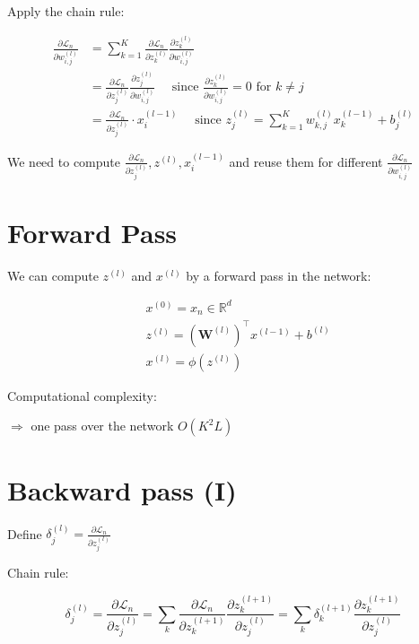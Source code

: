 Apply the chain rule:

$$
\begin{aligned}
\frac{\partial \mathscr{L}_{n}}{\partial w_{i, j}^{(l)}} & =\sum_{k=1}^{K} \frac{\partial \mathscr{L}_{n}}{\partial z_{k}^{(l)}} \frac{\partial z_{k}^{(l)}}{\partial w_{i, j}^{(l)}} \\
& =\frac{\partial \mathscr{L}_{n}}{\partial z_{j}^{(l)}} \frac{\partial z_{j}^{(l)}}{\partial w_{i, j}^{(l)}} \quad \text { since } \frac{\partial z_{k}^{(l)}}{\partial w_{i, j}^{(l)}}=0 \text { for } k \neq j \\
& =\frac{\partial \mathscr{L}_{n}}{\partial z_{j}^{(l)}} \cdot x_{i}^{(l-1)} \quad \text { since } z_{j}^{(l)}=\sum_{k=1}^{K} w_{k, j}^{(l)} x_{k}^{(l-1)}+b_{j}^{(l)}
\end{aligned}
$$

We need to compute $\frac{\partial \mathscr{L}_{n}}{\partial z_{j}^{(l)}}, z^{(l)}, x_{i}^{(l-1)}$ and reuse them for different $\frac{\partial \mathscr{L}_{n}}{\partial w_{i, j}^{(l)}}$

\section*{Forward Pass}
We can compute $z^{(l)}$ and $x^{(l)}$ by a forward pass in the network:

$$
\begin{aligned}
& x^{(0)}=x_{n} \in \mathbb{R}^{d} \\
& z^{(l)}=\left(\mathbf{W}^{(l)}\right)^{\top} x^{(l-1)}+b^{(l)} \\
& x^{(l)}=\phi\left(z^{(l)}\right)
\end{aligned}
$$

Computational complexity:



$\Rightarrow$ one pass over the network $O\left(K^{2} L\right)$

\section*{Backward pass (I)}
Define $\delta_{j}^{(l)}=\frac{\partial \mathscr{L}_{n}}{\partial z_{j}^{(l)}}$

Chain rule:

$$
\delta_{j}^{(l)}=\frac{\partial \mathscr{L}_{n}}{\partial z_{j}^{(l)}}=\sum_{k} \frac{\partial \mathscr{L}_{n}}{\partial z_{k}^{(l+1)}} \frac{\partial z_{k}^{(l+1)}}{\partial z_{j}^{(l)}}=\sum_{k} \delta_{k}^{(l+1)} \frac{\partial z_{k}^{(l+1)}}{\partial z_{j}^{(l)}}
$$

